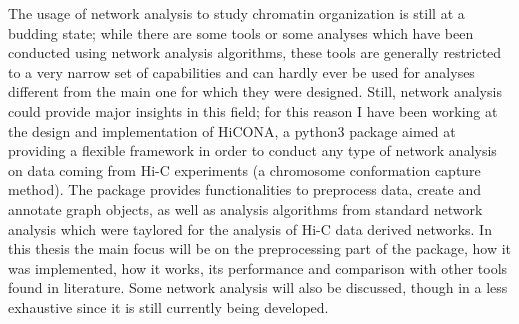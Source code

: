The usage of network analysis to study chromatin organization is still at a budding state; while there are some tools or some analyses which have been conducted using network analysis algorithms, these tools are generally restricted to a very narrow set of capabilities and can hardly ever be used for analyses different from the main one for which they were designed. Still, network analysis could provide major insights in this field; for this reason I have been working at the design and implementation of HiCONA, a python3 package aimed at providing a flexible framework in order to conduct any type of network analysis on data coming from Hi-C experiments (a chromosome conformation capture method). The package provides functionalities to preprocess data, create and annotate graph objects, as well as analysis algorithms from standard network analysis which were taylored for the analysis of Hi-C data derived networks. In this thesis the main focus will be on the preprocessing part of the package, how it was implemented, how it works, its performance and comparison with other tools found in literature. Some network analysis will also be discussed, though in a less exhaustive since it is still currently being developed.
